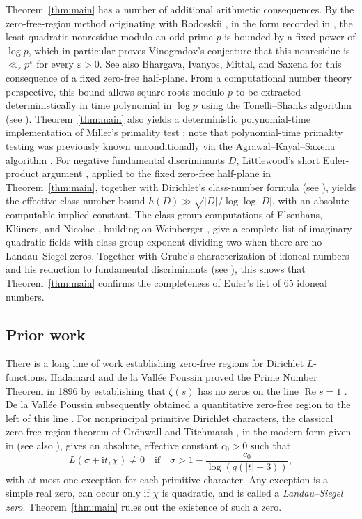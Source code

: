 \documentclass[11pt,a4paper]{article}
\numberwithin{equation}{section}
\numberwithin{figure}{section}
\theoremstyle{definition}
\theoremstyle{remark}
\newcommand{\Rea}{\operatorname{Re}}
\begin{document}
Theorem~\ref{thm:main} has a number of additional arithmetic consequences.
By the zero-free-region method originating with Rodosski\u{\i} \cite{Rod56},
in the form recorded in \cite[Theorem~13.12]{MV07}, the least quadratic nonresidue modulo
an odd prime $p$ is bounded by a fixed power of $\log p$, which in particular
proves Vinogradov's conjecture \cite{Vin85} that this nonresidue is
$\ll_{\varepsilon}p^{\varepsilon}$ for every $\varepsilon>0$.
See also Bhargava, Ivanyos, Mittal, and Saxena
\cite[Theorem~6.7]{BIMS17} for this consequence of a fixed zero-free half-plane.
From a computational number theory perspective, this bound allows square
roots modulo $p$ to be extracted deterministically in time polynomial in
$\log p$ using the Tonelli--Shanks algorithm
(see \cite[\S2.9]{Galbraith12}).
Theorem~\ref{thm:main} also yields a deterministic polynomial-time
implementation of Miller's primality test \cite{Mil76}; note that
polynomial-time primality testing was previously known unconditionally
via the Agrawal--Kayal--Saxena algorithm \cite{AKS04}.
For negative fundamental discriminants $D$, Littlewood's short Euler-product
argument \cite{Lit28}, applied to the fixed zero-free half-plane in
Theorem~\ref{thm:main}, together with Dirichlet's class-number formula
(see \cite[Chapter~6]{Dav00}), yields the effective class-number bound
$h(D)\gg\sqrt{|D|}/\log\log|D|$, with an absolute computable implied constant.
The class-group computations of Elsenhans, Kl\"uners, and Nicolae
\cite[Theorem~2]{EKN20}, building on Weinberger \cite{Wei73}, give a complete
list of imaginary quadratic fields with class-group exponent dividing two
when there are no Landau--Siegel zeros. Together with Grube's
characterization of idoneal numbers and his reduction to fundamental
discriminants \cite{Gru74} (see \cite[Theorem~6 and \S2.3]{Kani11}),
this shows that Theorem~\ref{thm:main} confirms the completeness of
Euler's list of 65 idoneal numbers.

\subsection{Prior work}

There is a long line of work establishing zero-free regions for Dirichlet $L$-functions. Hadamard and de la Vall\'ee Poussin proved the Prime Number Theorem
in 1896 by establishing that $\zeta(s)$ has no zeros on the line
$\Rea s=1$ \cite{Had96,VP96}. De la Vall\'ee Poussin subsequently obtained a
quantitative zero-free region to the left of this line \cite{VP99}.
For nonprincipal primitive Dirichlet characters, the classical zero-free-region theorem of Gr\"onwall and Titchmarsh
\cite{Gro13,Tit30}, in the modern form given in \cite[Theorem~5.26]{IK04}
(see also \cite[Chapter~14]{Dav00}), gives an absolute, effective constant $c_0>0$ such that
\begin{equation}\label{eq:intro-classical-region}
 L(\sigma+\mathrm i t,\chi)\ne0
 \quad\text{if}\quad
 \sigma>1-\frac{c_0}{\log(q(|t|+3))},
\end{equation}
with at most one exception for each primitive character.
Any exception is a simple real zero, can occur only if
$\chi$ is quadratic, and is called a \emph{Landau--Siegel zero}. Theorem~\ref{thm:main} rules out the existence of such a zero.
\end{document}
